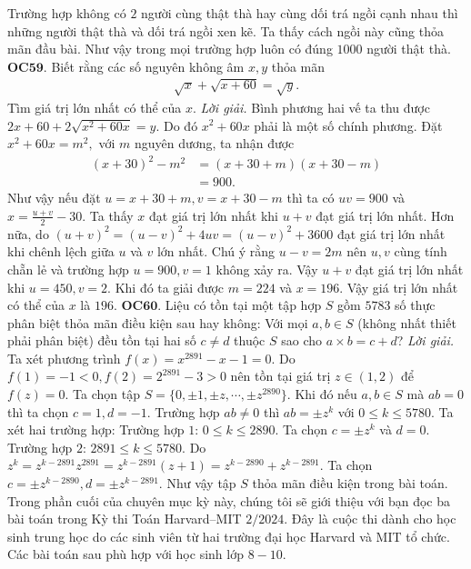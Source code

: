\begin{multicols}{2}
	\vskip 0.1cm
	Trường hợp không có $2$ người cùng thật thà hay cùng dối trá ngồi cạnh nhau thì những người thật thà và dối trá ngồi xen kẽ. Ta thấy cách ngồi này cũng thỏa mãn đầu bài. Như vậy trong mọi trường hợp luôn có đúng $1000$ người thật thà.   
	\vskip 0.1cm
	{\bf\color{cackithi} OC$\pmb{59.}$} Biết rằng các số nguyên không âm $x,y$ thỏa mãn
	\begin{align*}
		\sqrt{x}+\sqrt{x+60}=\sqrt{y}.
	\end{align*}
	Tìm giá trị lớn nhất có thể của $x$.
	\vskip 0.1cm
	\textit{Lời giải.}
	Bình phương  hai vế ta thu được $2x+60+2\sqrt{x^2+60x}=y.$ Do đó ${x^2+60x}$ phải là một số chính phương. Đặt $x^2+60x=m^2,$ với $m$ nguyên dương, ta nhận được
	\begin{align*}
		(x+30)^2-m^2&=(x+30+m)(x+30-m)\\
		&=900.
	\end{align*}
	Như vậy nếu đặt $u=x+30+m, v=x+30-m$ thì  ta có $uv=900$ và $ x=\frac{u+v}{2}-30.$  Ta thấy $x$ đạt giá trị lớn nhất khi $u+v$ đạt giá trị lớn nhất. Hơn nữa, do $(u+v)^2=(u-v)^2+4uv= (u-v)^2+ 3600$ đạt giá trị  lớn nhất khi chênh lệch giữa $u$ và $v$ lớn nhất. Chú ý rằng $u-v=2m$ nên $u, v$ cùng tính chẵn lẻ và trường hợp $u=900, v=1$ không xảy ra. Vậy $u+v$ đạt giá trị lớn nhất khi $u=450, v=2.$ Khi đó ta giải được $m=224$ và $x=196.$ Vậy giá trị lớn nhất có thể của $x$ là $196$.
	\vskip 0.1cm
	{\bf\color{cackithi} OC$\pmb{60.}$} Liệu có tồn tại một tập hợp $S$ gồm $5783$ số thực phân biệt thỏa mãn điều kiện sau hay không:
	Với mọi $a,b\in S$ (không nhất thiết phải phân biệt) đều tồn tại hai số $c\neq d$ thuộc $S$ sao cho $a \times b=c+d$?
	\vskip 0.1cm
	\textit{Lời giải.} Ta xét phương trình $f(x)=x^{2891}-x-1=0.$ Do $f(1)=-1<0, f(2)=2^{2891}-3>0$ nên tồn tại giá trị $z\in (1,2)$ để $f(z)=0.$ 
	\vskip 0.1cm
	Ta chọn tập $S=\{0, \pm 1, \pm z, \cdots, \pm z^{2890}\}.$ Khi đó nếu $a,b\in S$ mà $ab=0$ thì ta chọn $c=1, d=-1.$ Trường hợp $ab\neq 0$ thì $ab=\pm z^k$ với $0\le k \le 5780.$ Ta xét hai trường hợp:
	\vskip 0.1cm
	Trường hợp $1$: $0\le k \le 2890.$ Ta chọn $c=\pm z^k$ và $d=0$.
	\vskip 0.1cm
	Trường hợp $2$: $2891\le k \le 5780.$ Do $z^{k}=z^{k-2891}z^{2891}=z^{k-2891}(z+1)=z^{k-2890} +z^{k-2891}.$ Ta chọn $c=\pm z^{k-2890}, d=\pm z^{k-2891}.$
	\vskip 0.1cm
	Như vậy tập $S$ thỏa mãn điều kiện trong bài toán.
	\vskip 0.1cm
	Trong phần cuối của chuyên mục kỳ này, chúng tôi sẽ giới thiệu với bạn đọc ba bài toán trong Kỳ thi Toán Harvard--MIT $2/2024$. Đây là cuộc thi dành cho học sinh trung học do các sinh viên từ hai trường đại học Harvard và MIT tổ chức. Các bài toán sau phù hợp với học sinh lớp $8-10$. 

\end{multicols}
